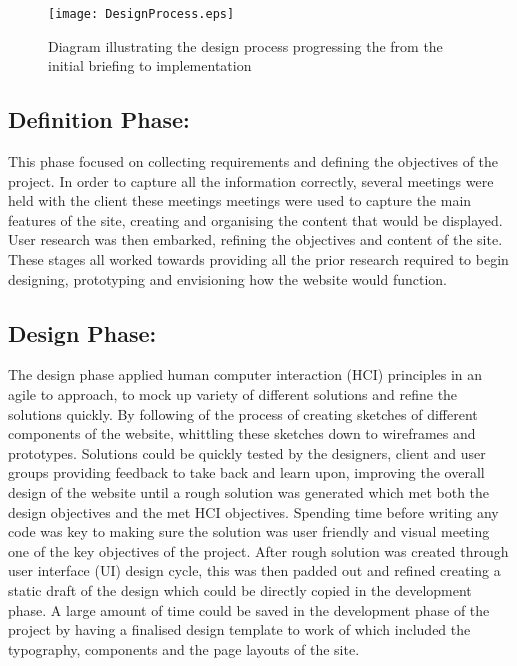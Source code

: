 \begin{figure}[H]
\centering
\texttt{[image: DesignProcess.eps]}
\caption{Diagram illustrating the design process progressing the from the initial briefing to implementation}
\label{designprocess}
\end{figure}

\hypertarget{definition-phase}{%
\subsection{Definition Phase:}\label{definition-phase}}

This phase focused on collecting requirements and defining the
objectives of the project. In order to capture all the information
correctly, several meetings were held with the client these meetings
meetings were used to capture the main features of the site, creating
and organising the content that would be displayed. User research was
then embarked, refining the objectives and content of the site. These
stages all worked towards providing all the prior research required to
begin designing, prototyping and envisioning how the website would
function.

\hypertarget{design-phase}{%
\subsection{Design Phase:}\label{design-phase}}

The design phase applied human computer interaction (HCI) principles in
an agile to approach, to mock up variety of different solutions and
refine the solutions quickly. By following of the process of creating
sketches of different components of the website, whittling these
sketches down to wireframes and prototypes. Solutions could be quickly
tested by the designers, client and user groups providing feedback to
take back and learn upon, improving the overall design of the website
until a rough solution was generated which met both the design
objectives and the met HCI objectives. Spending time before writing any
code was key to making sure the solution was user friendly and visual
meeting one of the key objectives of the project. After rough solution
was created through user interface (UI) design cycle, this was then
padded out and refined creating a static draft of the design which could
be directly copied in the development phase. A large amount of time
could be saved in the development phase of the project by having a
finalised design template to work of which included the typography,
components and the page layouts of the site.

